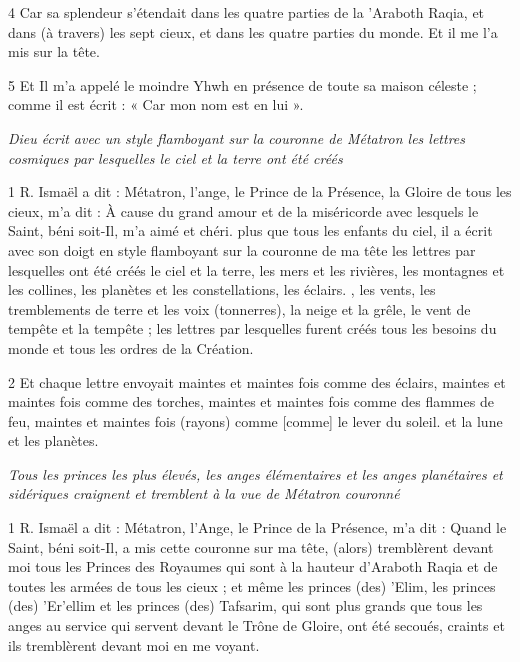 \par 4 Car sa splendeur s'étendait dans les quatre parties de la 'Araboth Raqia, et dans (à travers) les sept cieux, et dans les quatre parties du monde. Et il me l'a mis sur la tête.

\par 5 Et Il m'a appelé le moindre Yhwh en présence de toute sa maison céleste ; comme il est écrit : « Car mon nom est en lui ».


\par \textit{Dieu écrit avec un style flamboyant sur la couronne de Métatron les lettres cosmiques par lesquelles le ciel et la terre ont été créés}

\par 1 R. Ismaël a dit : Métatron, l'ange, le Prince de la Présence, la Gloire de tous les cieux, m'a dit : À cause du grand amour et de la miséricorde avec lesquels le Saint, béni soit-Il, m'a aimé et chéri. plus que tous les enfants du ciel, il a écrit avec son doigt en style flamboyant sur la couronne de ma tête les lettres par lesquelles ont été créés le ciel et la terre, les mers et les rivières, les montagnes et les collines, les planètes et les constellations, les éclairs. , les vents, les tremblements de terre et les voix (tonnerres), la neige et la grêle, le vent de tempête et la tempête ; les lettres par lesquelles furent créés tous les besoins du monde et tous les ordres de la Création.

\par 2 Et chaque lettre envoyait maintes et maintes fois comme des éclairs, maintes et maintes fois comme des torches, maintes et maintes fois comme des flammes de feu, maintes et maintes fois (rayons) comme [comme] le lever du soleil. et la lune et les planètes.


\par \textit{Tous les princes les plus élevés, les anges élémentaires et les anges planétaires et sidériques craignent et tremblent à la vue de Métatron couronné}

\par 1 R. Ismaël a dit : Métatron, l'Ange, le Prince de la Présence, m'a dit : Quand le Saint, béni soit-Il, a mis cette couronne sur ma tête, (alors) tremblèrent devant moi tous les Princes des Royaumes qui sont à la hauteur d'Araboth Raqia et de toutes les armées de tous les cieux ; et même les princes (des) 'Elim, les princes (des) 'Er'ellim et les princes (des) Tafsarim, qui sont plus grands que tous les anges au service qui servent devant le Trône de Gloire, ont été secoués, craints et ils tremblèrent devant moi en me voyant.

